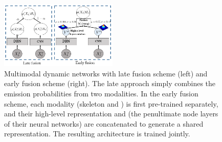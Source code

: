 \begin{figure}[t]
  \centering
  \includegraphics[width=0.5\textwidth]{images/Fusion_combined}
\vspace*{-2mm}
\caption{
Multimodal dynamic networks with late fusion scheme (left) and early fusion scheme (right).
The late approach simply combines the emission probabilities from two modalities.
In the early fusion scheme, each modality (skeleton and \RGBD) is first pre-trained separately,
and their high-level representation \highSK and \highRGBD (the penultimate node layers of their neural networks)
are concatenated to generate a shared representation. The resulting architecture is trained jointly.
  }\label{fig:fusion}
\end{figure}



\endinput
